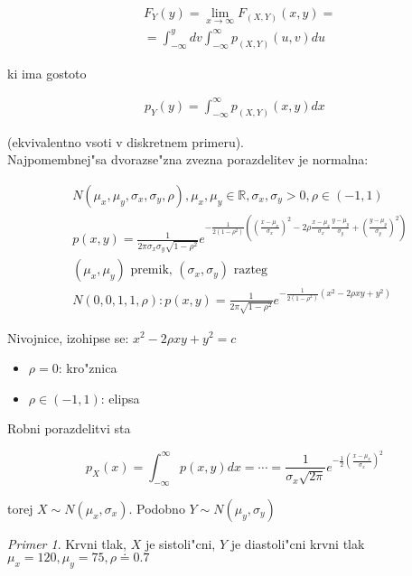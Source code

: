 \documentclass[a4paper,12pt]{article}
\theoremstyle{definition}
\theoremstyle{remark}
\newtheorem*{ex}{Primer}
\newcommand{\R}{\mathbb{R}}
\begin{document}
\begin{align*}
    &F_Y(y) = \lim_{x \to \infty} F_{(X,Y)}(x,y) = \\
    &= \int_{-\infty}^{y} dv \int_{-\infty}^{\infty} p_{(X,Y)}(u,v) du
\end{align*}

ki ima gostoto

\begin{align*}
    p_Y(y) = \int_{-\infty}^{\infty} p_{(X,Y)}(x,y) dx
\end{align*}

(ekvivalentno vsoti v diskretnem primeru). \\
Najpomembnej"sa dvorazse"zna zvezna porazdelitev je normalna:

\begin{align*}
    &N(\mu_x, \mu_y, \sigma_x, \sigma_y, \rho), \mu_x, \mu_y \in \R, \sigma_x, \sigma_y > 0, \rho \in (-1,1) \\
    &p(x,y) = \frac{1}{2\pi \sigma_x \sigma_y \sqrt{1-\rho^2}} e^{-\frac{1}{2 (1-\rho^2)}
        ((\frac{x-\mu_x}{\sigma_x})^2 - 2 \rho \frac{x-\mu_x}{\sigma_x} \frac{y-\mu_y}{\sigma_y} +
        (\frac{y-\mu_y}{\sigma_y})^2)} \\
    &(\mu_x, \mu_y) \text{ premik, } (\sigma_x, \sigma_y) \text{ razteg} \\
    &N(0,0,1,1,\rho): p(x,y) = \frac{1}{2\pi \sqrt{1-\rho^2}} e^{-\frac{1}{2 (1-\rho^2)} (x^2 - 2 \rho x y + y^2)}
\end{align*}

Nivojnice, izohipse se: $x^2 - 2 \rho x y + y^2 = c$

\begin{itemize}
    \item $\rho = 0$: kro"znica
    \item $\rho \in (-1,1)$: elipsa
\end{itemize}

Robni porazdelitvi sta

\begin{equation*}
    p_X(x) = \int_{-\infty}^{\infty} p(x,y) dx = \cdots = \frac{1}{\sigma_x \sqrt{2\pi}}
    e^{-\frac{1}{2} (\frac{x-\mu_x}{\sigma_x})^2}
\end{equation*}

torej $X \sim N(\mu_x, \sigma_x)$. Podobno $Y \sim N(\mu_y, \sigma_y)$

\begin{ex}
    Krvni tlak, $X$ je sistoli"cni, $Y$ je diastoli"cni krvni tlak \\
    $\mu_x = 120, \mu_y = 75, \rho \doteq 0.7$
\end{ex}
\end{document}
